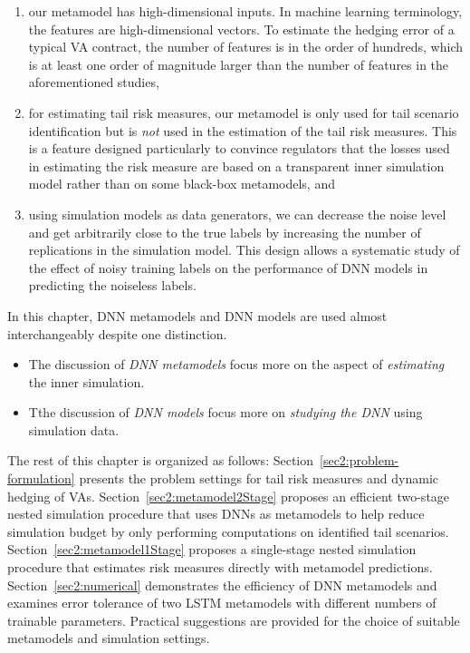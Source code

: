 \begin{enumerate}
    \item  our metamodel has high-dimensional inputs. In machine learning terminology, the features are high-dimensional vectors.
    To estimate the hedging error of a typical VA contract, the number of features is in the order of hundreds, which is at least one order of magnitude larger than the number of features in the aforementioned studies,
    \item  for estimating tail risk measures, our metamodel is only used for tail scenario identification but is \textit{not} used in the estimation of the tail risk measures.
    This is a feature designed particularly to convince regulators that the losses used in estimating the risk measure are based on a transparent inner simulation model rather than on some black-box metamodels, and
    \item  using simulation models as data generators, we can decrease the noise level and get arbitrarily close to the true labels by increasing the number of replications in the simulation model.
    This design allows a systematic study of the effect of noisy training labels on the performance of DNN models in predicting the noiseless labels.
\end{enumerate}

In this chapter, DNN metamodels and DNN models are used almost interchangeably despite one distinction.
\begin{itemize}
    \item The discussion of \textit{DNN metamodels} focus more on the aspect of \textit{estimating} the inner simulation.
    \item Tthe discussion of \textit{DNN models} focus more on \textit{studying the DNN} using simulation data.
\end{itemize}

The rest of this chapter is organized as follows: 
Section~\ref{sec2:problem-formulation} presents the problem settings for tail risk measures and dynamic hedging of VAs. 
Section~\ref{sec2:metamodel2Stage} proposes an efficient two-stage nested simulation procedure that uses DNNs as metamodels to help reduce simulation budget by only performing computations on identified tail scenarios. 
Section~\ref{sec2:metamodel1Stage} proposes a single-stage nested simulation procedure that estimates risk measures directly with metamodel predictions.
Section~\ref{sec2:numerical} demonstrates the efficiency of DNN metamodels and examines error tolerance of two LSTM metamodels with different numbers of trainable parameters. 
Practical suggestions are provided for the choice of suitable metamodels and simulation settings. 

